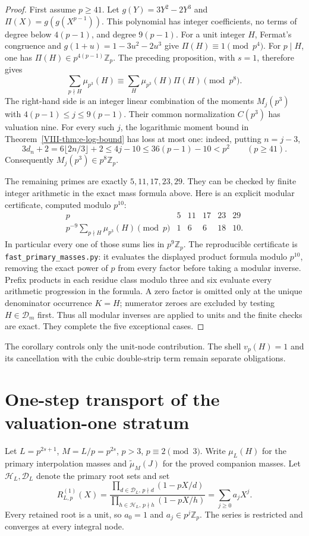 \documentclass[11pt,letterpaper]{article}
\numberwithin{equation}{section}
\begin{document}
\begin{proof}
First assume $p\ge41$. Let $g(Y)=3Y^2-2Y^3$ and $\Pi(X)=g(g(X^{p-1}))$. This polynomial
has integer coefficients, no terms of degree below $4(p-1)$, and
degree $9(p-1)$. For a unit integer $H$, Fermat's congruence and
$g(1+u)=1-3u^2-2u^3$ give $\Pi(H)\equiv1\pmod{p^4}$.
For $p\mid H$, one has $\Pi(H)\in p^{4(p-1)}\mathbb Z_p$.
The preceding proposition, with $s=1$, therefore gives
\[
 \sum_{p\nmid H}\mu_{p^3}(H)
 \equiv\sum_H\mu_{p^3}(H)\Pi(H)\pmod{p^8}.
\]
The right-hand side is an integer linear combination of the moments
$M_j(p^3)$ with $4(p-1)\le j\le9(p-1)$. Their common normalization
$C(p^3)$ has valuation nine. For every such $j$, the logarithmic
moment bound in Theorem~\ref{VIII-thm:e-log-bound} has loss at most one:
indeed, putting $n=j-3$,
\[
 3d_n+2=6\lfloor2n/3\rfloor+2\le4j-10
 \le36(p-1)-10<p^2 \qquad(p\ge41).
\]
Consequently $M_j(p^3)\in p^8\mathbb Z_p$.

The remaining primes are exactly $5,11,17,23,29$. They can be checked
by finite integer arithmetic in the exact mass formula above. Here is
an explicit modular certificate, computed modulo $p^{10}$:
\[
\begin{array}{c|rrrrr}
p&5&11&17&23&29\\\hline
p^{-9}\sum_{p\nmid H}\mu_{p^3}(H)\pmod p&1&6&6&18&10.
\end{array}
\]
In particular every one of those sums lies in $p^9\mathbb Z_p$.
The reproducible certificate is \nolinkurl{fast_primary_masses.py}:
it evaluates the displayed product formula modulo $p^{10}$,
removing the exact power of $p$ from every factor before taking a
modular inverse. Prefix products in each residue class modulo three
and six evaluate every arithmetic progression in the formula. A zero
factor is omitted only at the unique denominator occurrence $K=H$;
numerator zeroes are excluded by testing $H\in\mathcal D_m$ first.
Thus all modular inverses are applied to units and the finite checks
are exact. They complete the five exceptional cases.
\end{proof}

The corollary controls only the unit-node contribution. The shell
$v_p(H)=1$ and its cancellation with the cubic double-strip term
remain separate obligations.

\section{One-step transport of the valuation-one stratum}\label{loc-VIII-9}
\label{VIII-sec:E7one-step}
Let $L=p^{2s+1}$, $M=L/p=p^{2s}$, $p>3$, $p\equiv2\pmod3$.
Write $\mu_L(H)$ for the primary interpolation masses and
$\widetilde\mu_M(J)$ for the proved companion masses.
Let $\mathcal H_L,\mathcal D_L$ denote the primary root sets and set
\[
 R^{(1)}_{L,p}(X)=
 \frac{\prod_{d\in\mathcal D_L,\,p\nmid d}(1-pX/d)}
 {\prod_{h\in\mathcal H_L,\,p\nmid h}(1-pX/h)}
 =\sum_{j\ge0}a_jX^j.
\]
Every retained root is a unit, so $a_0=1$ and $a_j\in p^j\mathbb Z_p$.
The series is restricted and converges at every integral node.
\end{document}
